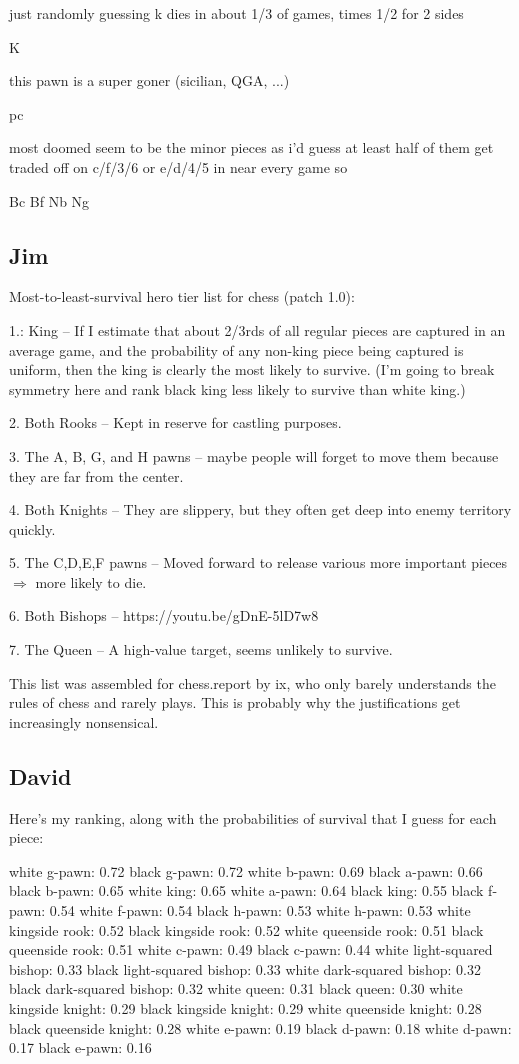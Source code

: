 \documentclass[twocolumn]{article}
\begin{document}
just randomly guessing k dies in about 1/3 of games, times 1/2 for 2
sides

K

this pawn is a super goner (sicilian, QGA, ...)

pc

most doomed seem to be the minor pieces as i'd guess at least half of
them get traded off on c/f/3/6 or e/d/4/5 in near every game so

Bc
Bf
Nb
Ng

\subsection{Jim}

Most-to-least-survival hero tier list for chess (patch 1.0):

1.: King
 -- If I estimate that about 2/3rds of all regular pieces are captured in an average game, and the probability of any non-king piece being captured is uniform, then the king is clearly the most likely to survive. (I'm going to break symmetry here and rank black king less likely to survive than white king.)

2. Both Rooks
 -- Kept in reserve for castling purposes.

3. The A, B, G, and H pawns
 -- maybe people will forget to move them because they are far from the center.

4. Both Knights
 -- They are slippery, but they often get deep into enemy territory quickly.

5. The C,D,E,F pawns
 -- Moved forward to release various more important pieces $\Rightarrow$ more likely to die.

6. Both Bishops
 -- https://youtu.be/gDnE-5lD7w8

7. The Queen
 -- A high-value target, seems unlikely to survive.

This list was assembled for chess.report by ix, who only barely
understands the rules of chess and rarely plays. This is probably why
the justifications get increasingly nonsensical.

\subsection{David}

Here's my ranking, along with the probabilities of survival that I guess for each piece:

white g-pawn: 0.72
black g-pawn: 0.72
white b-pawn: 0.69
black a-pawn: 0.66
black b-pawn: 0.65
white king: 0.65
white a-pawn: 0.64
black king: 0.55
black f-pawn: 0.54
white f-pawn: 0.54
black h-pawn: 0.53
white h-pawn: 0.53
white kingside rook: 0.52
black kingside rook: 0.52
white queenside rook: 0.51
black queenside rook: 0.51
white c-pawn: 0.49
black c-pawn: 0.44
white light-squared bishop: 0.33
black light-squared bishop: 0.33
white dark-squared bishop: 0.32
black dark-squared bishop: 0.32
white queen: 0.31
black queen: 0.30
white kingside knight: 0.29
black kingside knight: 0.29
white queenside knight: 0.28
black queenside knight: 0.28
white e-pawn: 0.19
black d-pawn: 0.18
white d-pawn: 0.17
black e-pawn: 0.16
\end{document}
